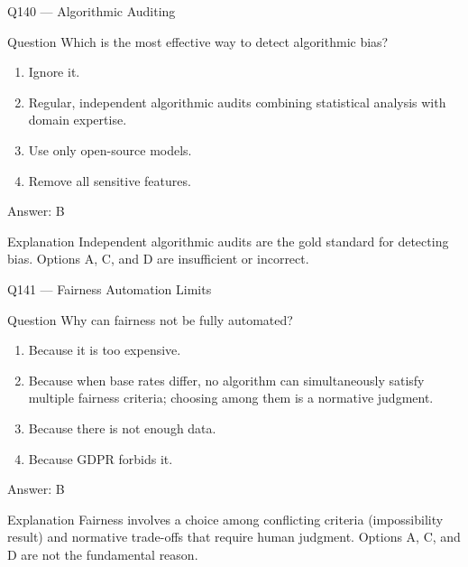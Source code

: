 \documentclass[aspectratio=169,8pt]{beamer}
\begin{document}
\begin{frame}{Q140 --- Algorithmic Auditing}
\begin{block}{Question}
Which is the most effective way to detect algorithmic bias?
\begin{enumerate}
\item Ignore it.
\item Regular, independent algorithmic audits combining statistical analysis with domain expertise.
\item Use only open-source models.
\item Remove all sensitive features.
\end{enumerate} 	\end{block}
\begin{exampleblock}{Answer: B}\end{exampleblock}
\begin{block}{Explanation}
Independent algorithmic audits are the gold standard for detecting bias. Options A, C, and D are insufficient or incorrect.
\end{block}
\end{frame}

\begin{frame}{Q141 --- Fairness Automation Limits}
\begin{block}{Question}
Why can fairness not be fully automated?
\begin{enumerate}
\item Because it is too expensive.
\item Because when base rates differ, no algorithm can simultaneously satisfy multiple fairness criteria; choosing among them is a normative judgment.
\item Because there is not enough data.
\item Because GDPR forbids it.
\end{enumerate} 	\end{block}
\begin{exampleblock}{Answer: B}\end{exampleblock}
\begin{block}{Explanation}
Fairness involves a choice among conflicting criteria (impossibility result) and normative trade-offs that require human judgment. Options A, C, and D are not the fundamental reason.
\end{block}
\end{frame}
\end{document}
